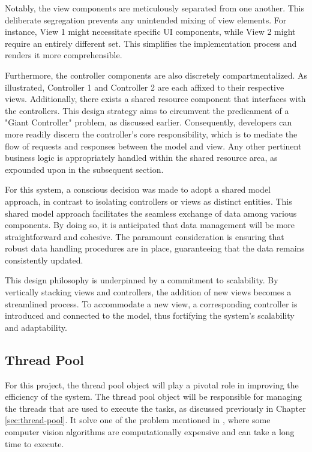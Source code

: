 Notably, the view components are meticulously separated from one another. This deliberate segregation prevents any unintended mixing of view elements. For instance, View 1 might necessitate specific UI components, while View 2 might require an entirely different set. This simplifies the implementation process and renders it more comprehensible.

Furthermore, the controller components are also discretely compartmentalized. As illustrated, Controller 1 and Controller 2 are each affixed to their respective views. Additionally, there exists a shared resource component that interfaces with the controllers. This design strategy aims to circumvent the predicament of a "Giant Controller" problem, as discussed earlier. Consequently, developers can more readily discern the controller's core responsibility, which is to mediate the flow of requests and responses between the model and view. Any other pertinent business logic is appropriately handled within the shared resource area, as expounded upon in the subsequent section.

For this system, a conscious decision was made to adopt a shared model approach, in contrast to isolating controllers or views as distinct entities. This shared model approach facilitates the seamless exchange of data among various components. By doing so, it is anticipated that data management will be more straightforward and cohesive. The paramount consideration is ensuring that robust data handling procedures are in place, guaranteeing that the data remains consistently updated.

This design philosophy is underpinned by a commitment to scalability. By vertically stacking views and controllers, the addition of new views becomes a streamlined process. To accommodate a new view, a corresponding controller is introduced and connected to the model, thus fortifying the system's scalability and adaptability.

\subsection{Thread Pool}
\label{subsec:thread-pool}

For this project, the thread pool object will play a pivotal role in improving the efficiency of the system. The thread pool object will be responsible for managing the threads that are used to execute the tasks, as discussed previously in Chapter \ref{sec:thread-pool}. It solve one of the problem mentioned in \cite{Sabtu_2023}, where some computer vision algorithms are computationally expensive and can take a long time to execute.

